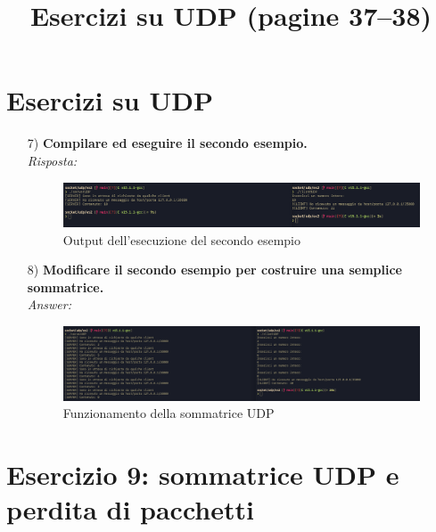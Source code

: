 \documentclass[a4paper,12pt]{article}
\title{Esercizi su UDP (pagine 37–38)}
\author{}
\date{}
\begin{document}
\maketitle

\section*{Esercizi su UDP}

\begin{enumerate}
  \item[7)] \textbf{Compilare ed eseguire il secondo esempio.}\\
    \emph{Risposta:}\\
    \begin{figure}[h]
      \centering
      \includegraphics[width=0.8\linewidth]{esecuzione.png}
      \caption{Output dell'esecuzione del secondo esempio}
    \end{figure}

  \item[8)] \textbf{Modificare il secondo esempio per costruire una semplice sommatrice.}\\
    \emph{Answer:}\\
    \begin{figure}[h]
      \centering
      \includegraphics[width=0.8\linewidth]{sommatrice.png}
      \caption{Funzionamento della sommatrice UDP}
    \end{figure}
\end{enumerate}

\section*{Esercizio 9: sommatrice UDP e perdita di pacchetti}
\end{document}

